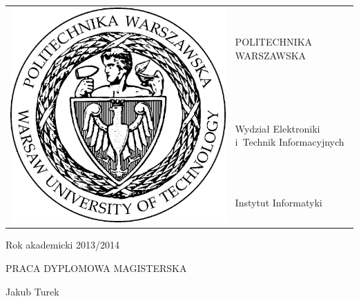 
\begin{titlepage}

 \begin{tabular}{ll}
  \multirow{3}{*}{\includegraphics[scale=0.3]{figures/pw.jpg}} & POLITECHNIKA WARSZAWSKA                      \\
                                                               & Wydział Elektroniki i~Technik Informacyjnych \\
                                                               & Instytut Informatyki
 \end{tabular}
 
 \begin{flushright}
  Rok akademicki 2013/2014
 \end{flushright}

 \vspace{2cm}
 
 \begin{center}
  \LARGE PRACA DYPLOMOWA MAGISTERSKA
  
  \vspace{2cm}
  
  \large Jakub Turek
  
  \vspace{2cm}
  

\end{center}
\end{titlepage}
